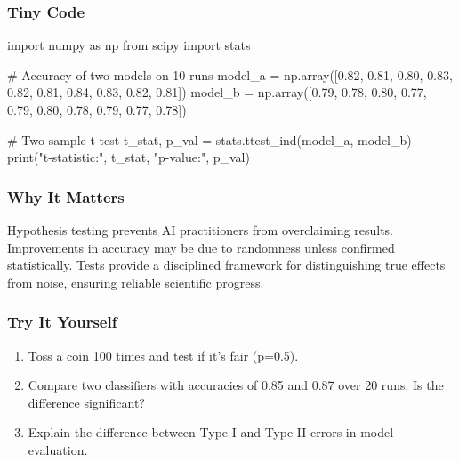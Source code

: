 \documentclass[
  letterpaper,
  DIV=11,
  numbers=noendperiod]{scrreprt}
\newenvironment{Shaded}{\begin{snugshade}}{\end{snugshade}}
\newcommand{\BuiltInTok}[1]{\textcolor[rgb]{0.00,0.23,0.31}{#1}}
\newcommand{\CommentTok}[1]{\textcolor[rgb]{0.37,0.37,0.37}{#1}}
\newcommand{\FloatTok}[1]{\textcolor[rgb]{0.68,0.00,0.00}{#1}}
\newcommand{\ImportTok}[1]{\textcolor[rgb]{0.00,0.46,0.62}{#1}}
\newcommand{\NormalTok}[1]{\textcolor[rgb]{0.00,0.23,0.31}{#1}}
\newcommand{\OperatorTok}[1]{\textcolor[rgb]{0.37,0.37,0.37}{#1}}
\newcommand{\StringTok}[1]{\textcolor[rgb]{0.13,0.47,0.30}{#1}}
\providecommand{\tightlist}{%
  \setlength{\itemsep}{0pt}\setlength{\parskip}{0pt}}
\begin{document}
\subsubsection{Tiny Code}\label{tiny-code-135}

\begin{Shaded}
\begin{Highlighting}[]
\ImportTok{import}\NormalTok{ numpy }\ImportTok{as}\NormalTok{ np}
\ImportTok{from}\NormalTok{ scipy }\ImportTok{import}\NormalTok{ stats}

\CommentTok{\# Accuracy of two models on 10 runs}
\NormalTok{model\_a }\OperatorTok{=}\NormalTok{ np.array([}\FloatTok{0.82}\NormalTok{, }\FloatTok{0.81}\NormalTok{, }\FloatTok{0.80}\NormalTok{, }\FloatTok{0.83}\NormalTok{, }\FloatTok{0.82}\NormalTok{, }\FloatTok{0.81}\NormalTok{, }\FloatTok{0.84}\NormalTok{, }\FloatTok{0.83}\NormalTok{, }\FloatTok{0.82}\NormalTok{, }\FloatTok{0.81}\NormalTok{])}
\NormalTok{model\_b }\OperatorTok{=}\NormalTok{ np.array([}\FloatTok{0.79}\NormalTok{, }\FloatTok{0.78}\NormalTok{, }\FloatTok{0.80}\NormalTok{, }\FloatTok{0.77}\NormalTok{, }\FloatTok{0.79}\NormalTok{, }\FloatTok{0.80}\NormalTok{, }\FloatTok{0.78}\NormalTok{, }\FloatTok{0.79}\NormalTok{, }\FloatTok{0.77}\NormalTok{, }\FloatTok{0.78}\NormalTok{])}

\CommentTok{\# Two{-}sample t{-}test}
\NormalTok{t\_stat, p\_val }\OperatorTok{=}\NormalTok{ stats.ttest\_ind(model\_a, model\_b)}
\BuiltInTok{print}\NormalTok{(}\StringTok{"t{-}statistic:"}\NormalTok{, t\_stat, }\StringTok{"p{-}value:"}\NormalTok{, p\_val)}
\end{Highlighting}
\end{Shaded}

\subsubsection{Why It Matters}\label{why-it-matters-33}

Hypothesis testing prevents AI practitioners from overclaiming results.
Improvements in accuracy may be due to randomness unless confirmed
statistically. Tests provide a disciplined framework for distinguishing
true effects from noise, ensuring reliable scientific progress.

\subsubsection{Try It Yourself}\label{try-it-yourself-135}

\begin{enumerate}
\def\labelenumi{\arabic{enumi}.}
\tightlist
\item
  Toss a coin 100 times and test if it's fair (p=0.5).
\item
  Compare two classifiers with accuracies of 0.85 and 0.87 over 20 runs.
  Is the difference significant?
\item
  Explain the difference between Type I and Type II errors in model
  evaluation.
\end{enumerate}
\end{document}
